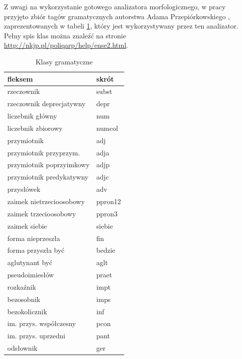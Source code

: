 Z uwagi na wykorzystanie gotowego analizatora morfologicznego, w pracy przyjęto zbiór tagów gramatycznych autorstwa Adama Przepiórkowskiego \cite{polishGrammarTagset}, zaprezentowanych w tabeli \ref{klasy-gramatyczne}, który jest wykorzystywany przez ten analizator. Pełny spis klas można znaleźć na stronie \url{http://nkjp.pl/poliqarp/help/ense2.html}.
\begin{table}[ht!]
\centering
\caption{Klasy gramatyczne}
\label{klasy-gramatyczne}
\begin{tabular}{|l|l|}
\hline
\textbf{fleksem}         & \textbf{skrót} \\ \hline
rzeczownik               & subst          \\ \hline
rzeczownik deprecjatywny & depr           \\ \hline
liczebnik główny         & num            \\ \hline
liczebnik zbiorowy       & numcol         \\ \hline
przymiotnik              & adj            \\ \hline
przymiotnik przyprzym.   & adja           \\ \hline
przymiotnik poprzyimkowy & adjp           \\ \hline
przymiotnik predykatywny & adjc           \\ \hline
przysłówek               & adv            \\ \hline
zaimek nietrzecioosobowy & ppron12        \\ \hline
zaimek trzecioosobowy    & ppron3         \\ \hline
zaimek siebie            & siebie         \\ \hline
forma nieprzeszła        & fin            \\ \hline
forma przyszła być       & bedzie         \\ \hline
aglutynant być           & aglt           \\ \hline
pseudoimiesłów           & praet          \\ \hline
rozkaźnik                & impt           \\ \hline
bezosobnik               & imps           \\ \hline
bezokolicznik            & inf            \\ \hline
im. przys. współczesny   & pcon           \\ \hline
im. przys. uprzedni      & pant           \\ \hline
odsłownik                & ger            \\ \hline

\end{tabular}
\end{table}

